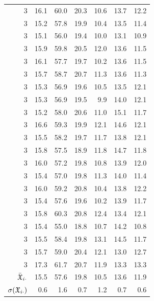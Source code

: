 \begin{center}
\begin{supertabular}{rrrrrrr}
      3     & 16.1 & 60.0   & 20.3  & 10.6  & 13.7  & 12.2  \\
      3     & 15.2 & 57.8   & 19.9  & 10.4  & 13.5  & 11.4  \\
      3     & 15.1 & 56.0   & 19.4  & 10.0  & 13.1  & 10.9  \\
      3     & 15.9 & 59.8   & 20.5  & 12.0  & 13.6  & 11.5  \\
      3     & 16.1 & 57.7   & 19.7  & 10.2  & 13.6  & 11.5  \\
      3     & 15.7 & 58.7   & 20.7  & 11.3  & 13.6  & 11.3  \\
      3     & 15.3 & 56.9   & 19.6  & 10.5  & 13.5  & 12.1  \\
      3     & 15.3 & 56.9   & 19.5  &  9.9  & 14.0  & 12.1  \\
      3     & 15.2 & 58.0   & 20.6  & 11.0  & 15.1  & 11.7  \\
      3     & 16.6 & 59.3   & 19.9  & 12.1  & 14.6  & 12.1  \\
      3     & 15.5 & 58.2   & 19.7  & 11.7  & 13.8  & 12.1  \\
      3     & 15.8 & 57.5   & 18.9  & 11.8  & 14.7  & 11.8  \\
      3     & 16.0 & 57.2   & 19.8  & 10.8  & 13.9  & 12.0  \\
      3     & 15.4 & 57.0   & 19.8  & 11.3  & 14.0  & 11.4  \\
      3     & 16.0 & 59.2   & 20.8  & 10.4  & 13.8  & 12.2  \\
      3     & 15.4 & 57.6   & 19.6  & 10.2  & 13.9  & 11.7  \\
      3     & 15.8 & 60.3   & 20.8  & 12.4  & 13.4  & 12.1  \\
      3     & 15.4 & 55.0   & 18.8  & 10.7  & 14.2  & 10.8  \\
      3     & 15.5 & 58.4   & 19.8  & 13.1  & 14.5  & 11.7  \\
      3     & 15.7 & 59.0   & 20.4  & 12.1  & 13.0  & 12.7  \\
      3     & 17.3 & 61.7   & 20.7  & 11.9  & 13.3  & 13.3  \\
      \midrule
 \(\bar{\mathfrak{X}}_{i\cdot} \)   & 15.5 &  57.6 & 19.8 & 10.5 & 13.6 & 11.9 \\
 \(\sigma(\mathfrak{X}_{i\cdot}) \) &  0.6 &   1.6 &  0.7 &  1.2 &  0.7 &  0.6 \\
      \bottomrule
  \end{supertabular}
\end{center}

